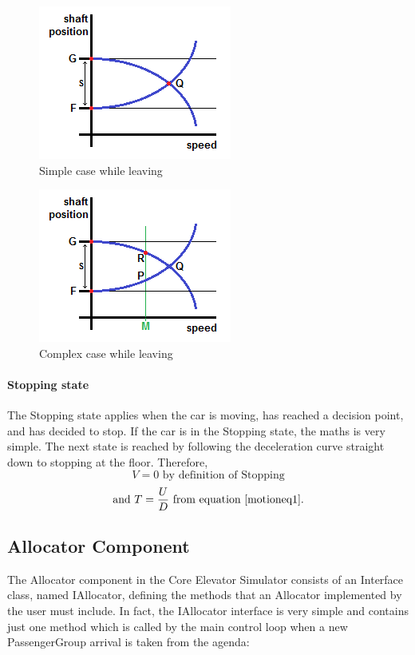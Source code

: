 \documentclass{UoYCSproject}
\begin{document}
\begin{figure} [h]
	\centering
	\includegraphics{leaving_simp.png}
	\caption{Simple case while leaving}
	\label{leavingsimp}
\end{figure}

\begin{figure} [h]
	\centering
	\includegraphics{leaving_comp.png}
	\caption{Complex case while leaving}
	\label{leavingcomp}
\end{figure}

\paragraph{Stopping state}

The Stopping state applies when the car is moving, has reached a decision point, and has decided to stop.  If the car is in the Stopping state, the maths is very simple.  The next state is reached by following the deceleration curve straight down to stopping at the floor.  Therefore,
\[ V=0 \text{ by definition of Stopping} \]
\[ \text{and } T=\frac{U}{D} \text{ from equation \ref{motioneq1}.} \]

\subsection{Allocator Component}
\label{coresimallocatordescription}

The Allocator component in the Core Elevator Simulator consists of an Interface class, named IAllocator, defining the methods that an Allocator implemented by the user must include.  In fact, the IAllocator interface is very simple and contains just one method which is called by the main control loop when a new PassengerGroup arrival is taken from the agenda:
\end{document}
